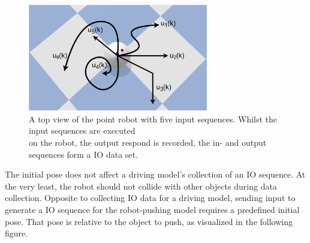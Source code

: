 \begin{figure}[H]
    \centering
    \includegraphics[width=0.7\textwidth]{figures/required_background/collect_io_robot}
    \caption{A top view of the point robot with five input sequences. Whilst the input sequences are executed\\on the robot, the output respond is recorded, the in- and output sequences form a \ac{IO} data set.}%
    \label{fig:collect_io_robot}
\end{figure}

The initial pose does not affect a driving model's collection of an \ac{IO} sequence. At the very least, the robot should not collide with other objects during data collection. Opposite to collecting \ac{IO} data for a driving model, sending input to generate a \ac{IO} sequence for the robot-pushing model requires a predefined initial pose. That pose is relative to the object to push, as visualized in the following figure.\bs

